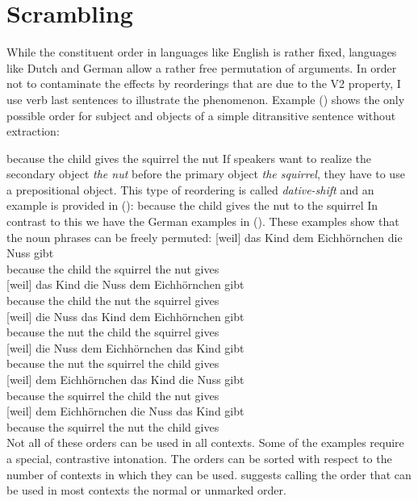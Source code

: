 \section{Scrambling}
\label{sec-phenomenon-scrambling}

While the constituent order in languages like English is rather fixed, languages like Dutch and
German allow a rather free permutation of arguments. In order not to contaminate the effects by
reorderings that are due to the V2 property, I use verb last sentences to illustrate the
phenomenon. Example () shows the only possible order for subject and objects of a simple
ditransitive sentence without extraction:


\ea
because the child gives the squirrel the nut 
\z
If speakers want to realize the secondary object \emph{the nut} before the primary object \emph{the
  squirrel}, they have to use a prepositional object. This type of reordering is called
\emph{dative-shift} and an example is provided in ():
\ea
because the child gives the nut to the squirrel 
\z
In contrast to this we have the German examples in (). These examples show that the noun
phrases can be freely permuted:
\eal
\ex 
\gll {}[weil]          das Kind dem Eichhörnchen die Nuss gibt\\
     \spacebr{}because the child the squirrel the nut gives\\
\ex 
\gll {}[weil]          das Kind die Nuss dem Eichhörnchen  gibt\\
     \spacebr{}because the child  the nut the squirrel gives\\
\ex 
\gll {}[weil]          die Nuss das Kind dem Eichhörnchen  gibt\\
     \spacebr{}because the nut the child  the squirrel gives\\
\ex 
\gll {}[weil]          die Nuss dem Eichhörnchen  das Kind gibt\\
     \spacebr{}because the nut the squirrel the child  gives\\
\ex 
\gll {}[weil]          dem Eichhörnchen  das Kind die Nuss gibt\\
     \spacebr{}because the squirrel the child  the nut gives\\
\ex 
\gll {}[weil]          dem Eichhörnchen  die Nuss das Kind gibt\\
     \spacebr{}because the squirrel the nut the child  gives\\
\zl
Not all of these orders can be used in all contexts. Some of the examples require a special,
contrastive intonation. The orders can be sorted with respect to the number of contexts in which
they can be used. \citet{Hoehle82a} suggests calling the order that can be used in most contexts the
normal or unmarked order.




